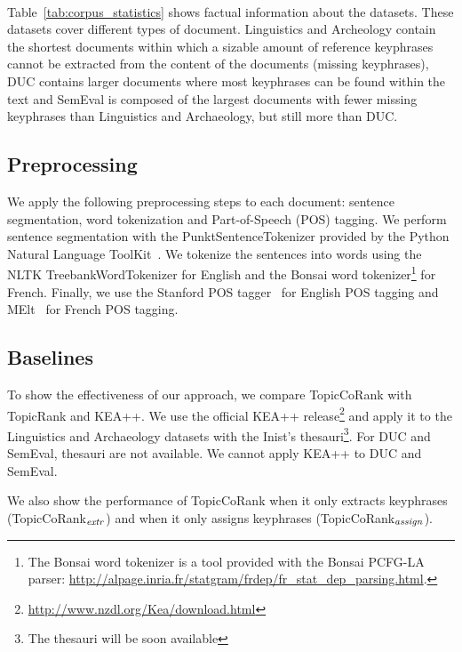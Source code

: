     \paragraph{}
    Table~\ref{tab:corpus_statistics} shows factual information about the
    datasets. These datasets cover different types of document. Linguistics and Archeology
    contain the shortest documents within which a sizable amount of reference
    keyphrases cannot be extracted from the content of the documents (missing keyphrases), DUC contains larger documents where
    most keyphrases can be found within the text and SemEval is composed of the largest
    documents with fewer missing keyphrases than Linguistics and Archaeology, but still more
    than DUC.

  \subsection{Preprocessing}
  \label{subsec:preprocessing}
    We apply the following preprocessing steps to each document: sentence segmentation, word tokenization and Part-of-Speech (POS)
    tagging. We perform sentence segmentation with the PunktSentenceTokenizer
    provided by the Python Natural Language ToolKit~\cite[NLTK]{bird2009nltk}.
    We tokenize the sentences into words using the NLTK TreebankWordTokenizer for
    English and the Bonsai word tokenizer\footnote{The Bonsai word tokenizer is
    a tool provided with the Bonsai PCFG-LA parser:
    \url{http://alpage.inria.fr/statgram/frdep/fr_stat_dep_parsing.html}.} for
    French. Finally, we use the Stanford POS
    tagger~\cite{toutanova2003stanfordpostagger} for English POS tagging and
    MElt~\cite{denis2009melt} for French POS tagging.

  \subsection{Baselines}
  \label{subsec:baselines}
    To show the effectiveness of our approach, we
    compare TopicCoRank with TopicRank and KEA++. We use the official KEA++
    release\footnote{\url{http://www.nzdl.org/Kea/download.html}} and apply it to
    the Linguistics and Archaeology datasets with the Inist's thesauri\footnote{The thesauri will be soon available}. For DUC and
    SemEval, thesauri are not available. We cannot apply KEA++ to DUC and SemEval.

    We also show the performance of TopicCoRank when it only extracts keyphrases
    (TopicCoRank$_\textnormal{\textit{extr}}$) and when it only assigns keyphrases
    (TopicCoRank$_\textnormal{\textit{assign}}$).
    
